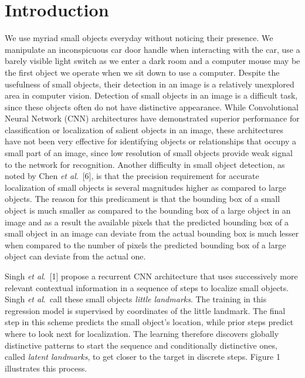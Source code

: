 \documentclass [11pt,letterpaper ,twoside ,openany ]{report}
\begin{document}
    \chapter{Introduction}
    \doublespacing
    We use myriad small objects everyday without noticing their presence. We manipulate an inconspicuous car door handle when interacting with the car, use a barely visible light switch as we enter a dark room and a computer mouse may be the first object we operate when we sit down to use a computer. Despite the usefulness of small objects, their detection in an image is a relatively unexplored area in computer vision. Detection of small objects in an image is a difficult task, since these objects often do not have distinctive appearance. While Convolutional Neural Network (CNN) architectures have demonstrated superior performance for classification or localization of salient objects in an image, these architectures have not been very effective for identifying objects or relationships that occupy a small part of an image, since low resolution of small objects provide weak signal to the network for recognition. Another difficulty in small object detection, as noted by Chen \textit{et al}.\ [6], is that the precision requirement for accurate localization of small objects is several magnitudes higher as compared to large objects. The reason for this predicament is that the bounding box of a small object is much smaller as compared to the bounding box of a large object in an image and as a result the available pixels that the predicted bounding box of a small object in an image can deviate from the actual bounding box is much lesser when compared to the number of pixels the predicted bounding box of a large object can deviate from the actual one.

    Singh \textit{et al}.\ [1] propose a recurrent CNN architecture that uses successively more relevant contextual information in a sequence of steps to localize small objects. Singh \textit{et al}.\ call these small objects \textit{little landmarks}. The training in this regression model is supervised by coordinates of the little landmark. The final step in this scheme predicts the small object's location, while prior steps predict where to look next for localization. The learning therefore discovers globally distinctive patterns to start the sequence and conditionally distinctive ones, called \textit {latent landmarks}, to get closer to the target in discrete steps. Figure 1 illustrates this process.
\end{document}
